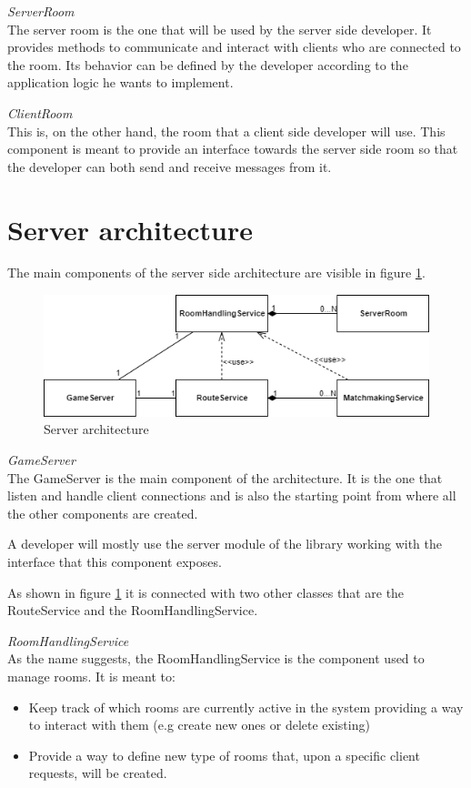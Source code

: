 \bigskip
\textit{ServerRoom}
\\
The server room is the one that will be used by the server side developer. It provides methods to communicate and interact with clients who are connected to the room. Its behavior can be defined by the developer according to the application logic he wants to implement.

\bigskip
\textit{ClientRoom}
\\
This is, on the other hand, the room that a client side developer will use. This component is meant to provide an interface towards the server side room so that the developer can both send and receive messages from it.

\section{Server architecture} \label{sec:server_arch}
The main components of the server side architecture are visible in figure \ref{fig:server_classes}. 

\begin{figure}[H]
	\centering
	\includegraphics[scale=0.7]{images/3-architecture/server-architecture.png}
	\caption{Server architecture}
	\label{fig:server_classes}
\end{figure}

\bigskip
\textit{GameServer}
\\
The GameServer is the main component of the architecture. It is the one that listen and handle client connections and is also the starting point from where all the other components are created.

A developer will mostly use the server module of the library working with the interface that this component exposes.

As shown in figure \ref{fig:server_classes} it is connected with two other classes that are the RouteService and the RoomHandlingService.

\bigskip
\textit{RoomHandlingService}
\\
As the name suggests, the RoomHandlingService is the component used to manage rooms. It is meant to: 
\begin{itemize}
	\item Keep track of which rooms are currently active in the system providing a way to interact with them (e.g create new ones or delete existing)
	\item Provide a way to define new type of rooms that, upon a specific client requests, will be created.
\end{itemize}


